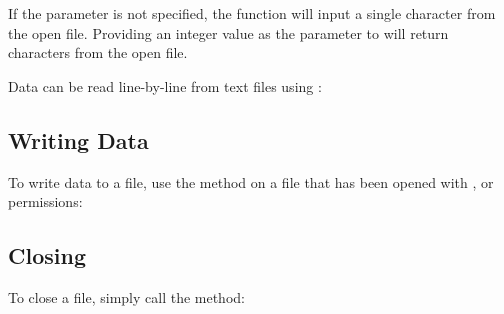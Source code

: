 \documentclass[a4paper,10pt,openany,english]{sphinxmanual}
\begin{document}
If the  parameter is not specified, the  function will input a single character from the open file. Providing an integer value  as the  parameter to  will return  characters from the open file.

Data can be read line-by-line from text files using :

\begin{sphinxVerbatim}[commandchars=\\\{\}]
  
\end{sphinxVerbatim}


\subsection{Writing Data}
\label{tutorial:writing-data}
To write data to a file, use the  method on a file that has been opened with ,  or  permissions:

\begin{sphinxVerbatim}[commandchars=\\\{\}]
 
  
  
\end{sphinxVerbatim}


\subsection{Closing}
\label{tutorial:closing}
To close a file, simply call the  method:
\end{document}
